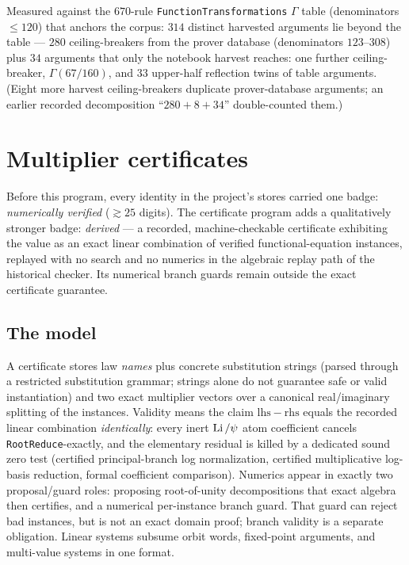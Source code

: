 \begin{result}\label{gamma:res:novelty}
Measured against the $670$-rule \texttt{FunctionTransformations} $\Gamma$ table
\cite{gamma:FT} (denominators $\le120$) that anchors the corpus: $314$ distinct harvested arguments lie
beyond the table --- $280$ ceiling-breakers from the prover database (denominators
$123$--$308$) plus $34$ arguments that only the notebook harvest reaches: one further
ceiling-breaker, $\Gamma(67/160)$, and $33$ upper-half reflection twins of table
arguments. (Eight more harvest ceiling-breakers duplicate prover-database arguments;
an earlier recorded decomposition ``$280+8+34$'' double-counted them.)
\end{result}

\section{Multiplier certificates}\label{gamma:sec:certmodel}

Before this program, every identity in the project's stores carried one badge:
\emph{numerically verified} ($\gtrsim25$ digits). The certificate program adds a
qualitatively stronger badge: \emph{derived} --- a recorded, machine-checkable certificate
exhibiting the value as an exact linear combination of verified functional-equation
instances, replayed with no search and no numerics in the algebraic replay path of the historical checker. Its numerical branch guards remain outside the exact certificate guarantee.

\subsection{The model}

A certificate stores law \emph{names} plus concrete substitution strings (parsed through a restricted substitution grammar; strings alone do not guarantee safe or valid instantiation) and two exact
multiplier vectors over a canonical real/imaginary splitting of the instances. Validity
means the claim $\mathrm{lhs}-\mathrm{rhs}$ equals the recorded linear combination
\emph{identically}: every inert $\operatorname{Li}/\psi$ atom coefficient cancels
\texttt{RootReduce}-exactly, and the elementary residual is killed by a dedicated sound
zero test (certified principal-branch log normalization, certified multiplicative
log-basis reduction, formal coefficient comparison). Numerics appear in exactly two
proposal/guard roles: proposing root-of-unity decompositions that exact algebra then
certifies, and a numerical per-instance branch guard. That guard can reject bad instances, but is not an exact domain proof; branch validity is a separate obligation. Linear systems subsume orbit
words, fixed-point arguments, and multi-value systems in one format.

